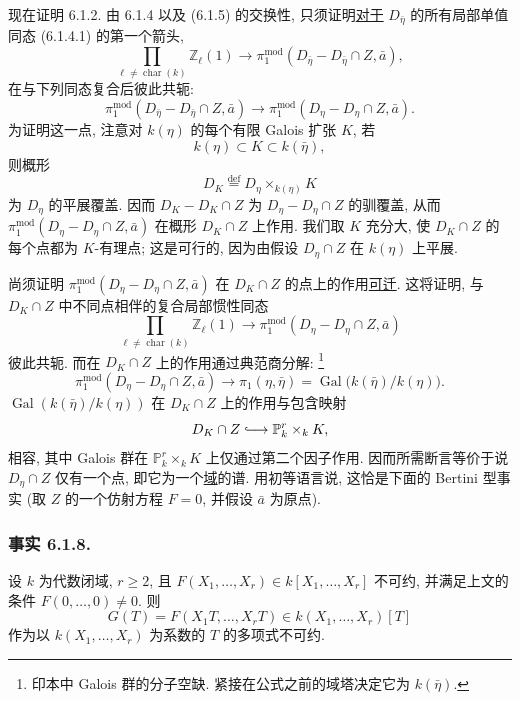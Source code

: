 现在证明 6.1.2. 由 6.1.4 以及 (6.1.5) 的交换性, 只须证明\underline{对于} $D_{\bar\eta}$ 的所有局部单值同态 (6.1.4.1) 的第一个箭头,
\begin{equation}\tag{6.1.7.1}
\prod_{\ell\ne\operatorname{char}(k)}\mathbb Z_\ell(1)
\longrightarrow
\pi_1^{\mathrm{mod}}(D_{\bar\eta}-D_{\bar\eta}\cap Z,\bar a),
\end{equation}
在与下列同态复合后彼此共轭:
\begin{equation}\tag{6.1.7.2}
\pi_1^{\mathrm{mod}}(D_{\bar\eta}-D_{\bar\eta}\cap Z,\bar a)
\longrightarrow
\pi_1^{\mathrm{mod}}(D_\eta-D_\eta\cap Z,\bar a).
\end{equation}
为证明这一点, 注意对 $k(\eta)$ 的每个有限 Galois 扩张 $K$, 若
\[
k(\eta)\subset K\subset k(\bar\eta),
\]
则概形
\[
D_K\stackrel{\mathrm{def}}{=}D_\eta\times_{k(\eta)}K
\]
为 $D_\eta$ 的平展覆盖. 因而 $D_K-D_K\cap Z$ 为 $D_\eta-D_\eta\cap Z$ 的驯覆盖, 从而 $\pi_1^{\mathrm{mod}}(D_\eta-D_\eta\cap Z,\bar a)$ 在概形 $D_K\cap Z$ 上作用. 我们取 $K$ 充分大, 使 $D_K\cap Z$ 的每个点都为 $K$-有理点; 这是可行的, 因为由假设 $D_\eta\cap Z$ 在 $k(\eta)$ 上平展.

尚须证明 $\pi_1^{\mathrm{mod}}(D_\eta-D_\eta\cap Z,\bar a)$ 在 $D_K\cap Z$ 的点上的作用\underline{可迁}. 这将证明, 与 $D_K\cap Z$ 中不同点相伴的复合局部惯性同态
\[
\prod_{\ell\ne\operatorname{char}(k)}\mathbb Z_\ell(1)
\longrightarrow
\pi_1^{\mathrm{mod}}(D_\eta-D_\eta\cap Z,\bar a)
\]
彼此共轭. 而在 $D_K\cap Z$ 上的作用通过典范商分解:
\footnote{印本中 Galois 群的分子空缺. 紧接在公式之前的域塔决定它为 $k(\bar\eta)$.}
\[
\pi_1^{\mathrm{mod}}(D_\eta-D_\eta\cap Z,\bar a)
\longrightarrow
\pi_1(\eta,\bar\eta)
=\operatorname{Gal}\bigl(k(\bar\eta)/k(\eta)\bigr).
\]
$\operatorname{Gal}(k(\bar\eta)/k(\eta))$ 在 $D_K\cap Z$ 上的作用与包含映射
\[
D_K\cap Z\lhook\joinrel\longrightarrow\mathbb P^r_k\times_k K,
\]
相容, 其中 Galois 群在 $\mathbb P^r_k\times_k K$ 上仅通过第二个因子作用. 因而所需断言等价于说 $D_\eta\cap Z$ 仅有一个点, 即它为一个\underline{域}的谱. 用初等语言说, 这恰是下面的 Bertini 型事实 (取 $Z$ 的一个仿射方程 $F=0$, 并假设 $\bar a$ 为原点).

\subsubsection*{事实 6.1.8.}
设 $k$ 为代数闭域, $r\ge2$, 且 $F(X_1,\ldots,X_r)\in k[X_1,\ldots,X_r]$ 不可约, 并满足上文的条件 $F(0,\ldots,0)\ne0$. 则
\[
G(T)=F(X_1T,\ldots,X_rT)\in k(X_1,\ldots,X_r)[T]
\]
作为以 $k(X_1,\ldots,X_r)$ 为系数的 $T$ 的多项式不可约.

